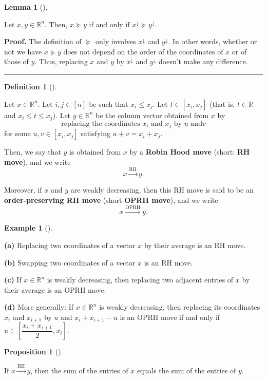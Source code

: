 \documentclass[numbers=enddot,12pt,final,onecolumn,notitlepage]{scrartcl}%
\numberwithin{exer}{subsection}
\theoremstyle{definition}
\newtheorem{lem}[theo]{Lemma}
\newenvironment{lemma}[1][]
{\begin{lem}[#1]\begin{leftbar}}
{\end{leftbar}\end{lem}}
\newtheorem{prop}[theo]{Proposition}
\newenvironment{proposition}[1][]
{\begin{prop}[#1]\begin{leftbar}}
{\end{leftbar}\end{prop}}
\newtheorem{defi}[theo]{Definition}
\newenvironment{definition}[1][]
{\begin{defi}[#1]\begin{leftbar}}
{\end{leftbar}\end{defi}}
\newtheorem{exam}[theo]{Example}
\newenvironment{example}[1][]
{\begin{exam}[#1]\begin{leftbar}}
{\end{leftbar}\end{exam}}
\newenvironment{proof}[1][Proof]{\noindent\textbf{#1.} }{\ \rule{0.5em}{0.5em}}
\begin{document}
\begin{lemma}
Let $x,y\in\mathbb{R}^{n}$. Then, $x\succcurlyeq y$ if and only if
$x^{\downarrow}\succcurlyeq y^{\downarrow}$.
\end{lemma}

\begin{proof}
The definition of $\succcurlyeq$ only involves $x^{\downarrow}$ and
$y^{\downarrow}$. In other words, whether or not we have $x\succcurlyeq y$
does not depend on the order of the coordinates of $x$ or of those of $y$.
Thus, replacing $x$ and $y$ by $x^{\downarrow}$ and $y^{\downarrow}$ doesn't
make any difference.
\end{proof}

\begin{definition}
Let $x\in\mathbb{R}^{n}$. Let $i,j\in\left[  n\right]  $ be such that
$x_{i}\leq x_{j}$. Let $t\in\left[  x_{i},x_{j}\right]  $ (that is,
$t\in\mathbb{R}$ and $x_{i}\leq t\leq x_{j}$). Let $y\in\mathbb{R}^{n}$ be the
column vector obtained from $x$ by%
\[
\text{replacing the coordinates }x_{i}\text{ and }x_{j}\text{ by }u\text{ and
}v
\]
for some $u,v\in\left[  x_{i},x_{j}\right]  $ satisfying $u+v=x_{i}+x_{j}$.

Then, we say that $y$ is obtained from $x$ by a \textbf{Robin Hood move}
(short: \textbf{RH move}), and we write
\[
x\overset{\text{RH}}{\longrightarrow}y.
\]


Moreover, if $x$ and $y$ are weakly decreasing, then this RH move is said to
be an \textbf{order-preserving RH move} (short \textbf{OPRH move}), and we
write
\[
x\overset{\text{OPRH}}{\longrightarrow}y.
\]

\end{definition}

\begin{example}
\textbf{(a)} Replacing two coordinates of a vector $x$ by their average is an
RH move.

\textbf{(b)} Swapping two coordinates of a vector $x$ is an RH move.

\textbf{(c)} If $x\in\mathbb{R}^{n}$ is weakly decreasing, then replacing two
adjacent entries of $x$ by their average is an OPRH move.

\textbf{(d)} More generally: If $x\in\mathbb{R}^{n}$ is weakly decreasing,
then replacing its coordinates $x_{i}$ and $x_{i+1}$ by $u$ and $x_{i}%
+x_{i+1}-u$ is an OPRH move if and only if $u\in\left[  \dfrac{x_{i}+x_{i+1}%
}{2},x_{i}\right]  $.
\end{example}

\begin{proposition}
If $x\overset{\text{RH}}{\longrightarrow}y$, then the sum of the entries of
$x$ equals the sum of the entries of $y$.
\end{proposition}
\end{document}
